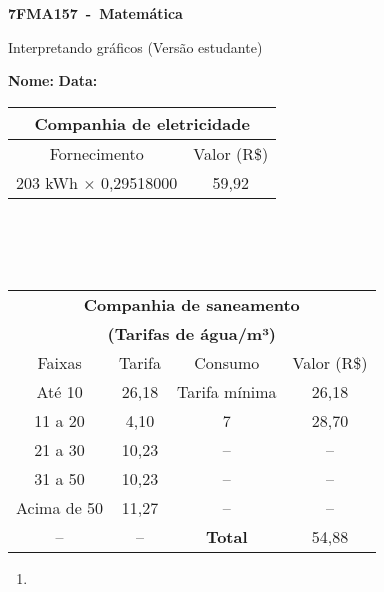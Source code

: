 \documentclass[a4paper,14pt]{article}
\begin{document}
	
	\noindent\textbf{7FMA157~-~Matemática} 
	
	\begin{center}Interpretando gráficos (Versão estudante)
	\end{center}
	
	
	\noindent\textbf{Nome:} \underline{\hspace{10cm}}
    \noindent\textbf{Data:} \underline{\hspace{4cm}}
	
	
	\begin{multicols}{2}
		
				\begin{tabular}{|c|c|}
			\hline
			\multicolumn{2}{|c|}{\textbf{Companhia de eletricidade}}\\
			\hline
			Fornecimento & Valor (R\$) \\
			\hline
			203 kWh $\times$ 0,29518000 & 59,92 \\
			\hline
		\end{tabular}
		\\\\\\
		\noindent
		\begin{tabular}{|c|c|c|c|}
			\hline
			\multicolumn{4}{|c|}{\textbf{Companhia de saneamento}}\\
			\multicolumn{4}{|c|}{\textbf{(Tarifas de água/m³)}}\\
			\hline
			Faixas & Tarifa & Consumo & Valor (R\$) \\
			\hline
			Até 10 & 26,18 & Tarifa mínima & 26,18 \\
			11 a 20 & 4,10 & 7 & 28,70 \\
			21 a 30 & 10,23 & -- & -- \\
			31 a 50 & 10,23 & -- & -- \\
			Acima de 50 & 11,27 & -- & -- \\
			-- & -- & \textbf{Total} & 54,88 \\
			\hline
		\end{tabular}
		
		\begin{enumerate}
			\item 
		\end{enumerate}
    \end{multicols}
\end{document}
